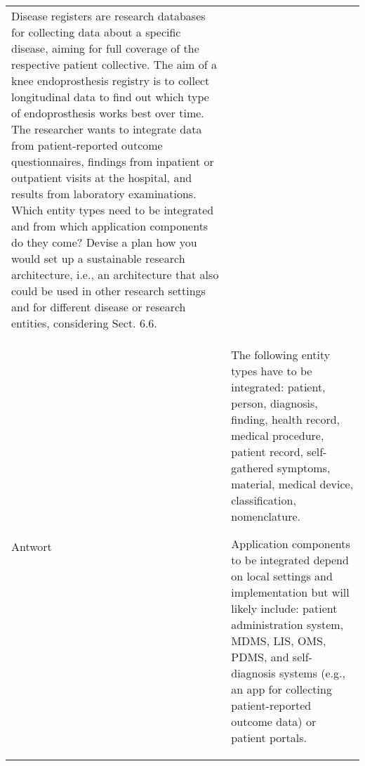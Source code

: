 \begin{landscape}
\begin{longtable}{p{3cm}p{}}
    Disease registers are research databases for collecting data about a specific disease, aiming for full coverage of the respective patient collective.
    The aim of a knee endoprosthesis registry is to collect longitudinal data to find out which type of endoprosthesis works best over time.
    The researcher wants to integrate data from patient-reported outcome questionnaires, findings from inpatient or outpatient visits at the hospital, and results from laboratory examinations.
    Which entity types need to be integrated and from which application components do they come? Devise a plan how you would set up a sustainable research architecture, i.e., an architecture that also could be used in other research settings and for different disease or research entities, considering Sect. 6.6. \\
    Antwort & The following entity types have to be integrated: patient, person, diagnosis, finding, health record, medical procedure, patient record, self-gathered symptoms, material, medical device, classification, nomenclature.

    Application components to be integrated depend on local settings and implementation but will likely include: patient administration system, MDMS, LIS, OMS, PDMS, and self-diagnosis systems (e.g., an app for collecting patient-reported outcome data) or patient portals.


\end{longtable}
\end{landscape}
